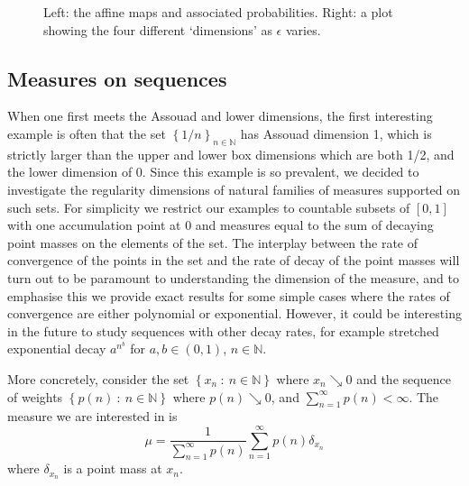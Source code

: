 \begin{figure}[H]
\begin{minipage}{.5\textwidth}
		
	\end{minipage}
	
	\caption{Left: the affine maps and associated probabilities.  Right: a plot showing the four different `dimensions' as $\epsilon$ varies.}
	\label{ch-upper-reg:fig:badcarpet}
\end{figure}




\subsection{Measures on sequences}

When one first meets the Assouad and lower dimensions, the first interesting example is often that the set $\left\{1/n \right\}_{n\in \mathbb{N}}$ has Assouad dimension 1, which is strictly larger than the upper and lower box dimensions which are both 1/2, and the lower dimension of 0.  Since this example is so prevalent, we decided to investigate the regularity dimensions of natural families of measures supported on such sets. For simplicity we restrict our examples to countable subsets of $[0,1]$ with one accumulation point at 0 and measures equal to the sum of decaying point masses on the elements of the set. The interplay between the rate of convergence of the points in the set and the rate of decay of the point masses will turn out to be paramount to understanding the dimension of the measure, and to emphasise this we provide exact results for some simple cases where the rates of convergence are either polynomial or exponential.  However, it could be interesting in the future to study  sequences with other decay rates, for example  stretched exponential decay $a^{n^b}$ for $a,b \in (0,1)$, $n \in \mathbb{N}$.

More concretely, consider the set $\left\{ x_n \ : \ n \in \mathbb{N}\right\}$ where  $x_n  \searrow 0$ and the sequence of weights $\left\{ p(n) \ : \ n \in \mathbb{N} \right\}$ where $p(n) \searrow 0$, and $\sum_{n=1}^\infty p(n) < \infty$.  The measure we are interested in is
\[
\mu = \frac{1}{\sum_{n=1}^\infty p(n) } \sum_{n=1}^\infty p(n)\delta_{x_n} 
\]
where $\delta_{x_n} $ is a point mass at $x_n$.

